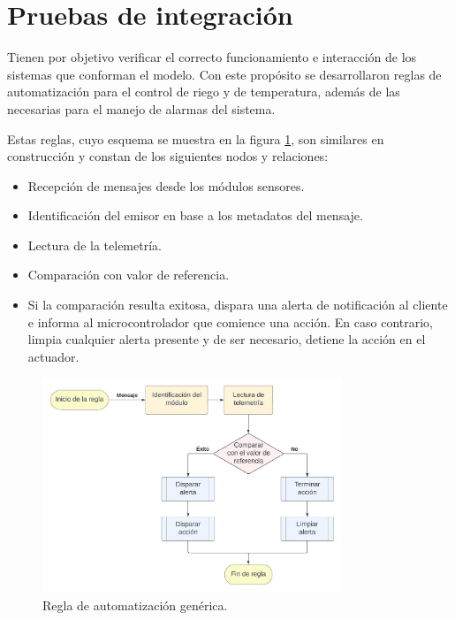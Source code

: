 \section{Pruebas de integración}
\label{sec:Pruebas de sistema}

Tienen por objetivo verificar el correcto funcionamiento e interacción de los sistemas que conforman el modelo. Con este propósito se desarrollaron reglas de automatización para el control de riego y de temperatura, además de las necesarias para el manejo de alarmas del sistema. 

Estas reglas, cuyo esquema se muestra en la figura \ref{fig:basic_rule}, son similares en construcción y constan de los siguientes nodos y relaciones:

\begin{itemize}
\item Recepción de mensajes desde los módulos sensores.
\item Identificación del emisor en base a los metadatos del mensaje.
\item Lectura de la telemetría.
\item Comparación con valor de referencia.
\item[] Si la comparación resulta exitosa, dispara una alerta de notificación al cliente e informa al microcontrolador que comience una acción. En caso contrario, limpia cualquier alerta presente y de ser necesario, detiene la acción en el actuador.
\end{itemize}





\begin{figure}[h]
	\centering
	\includegraphics[width=0.8\textwidth]{./Figures/chapter4/ReglaBasica.jpg}
	\caption[Regla de automatización genérica]{Regla de automatización genérica.}
	\label{fig:basic_rule}
\end{figure}

